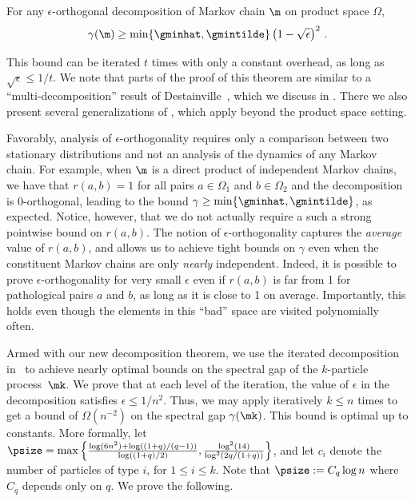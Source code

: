 \begin{theorem}\label{thm:productspaces}
For any $\epsilon$-orthogonal decomposition of Markov chain $\m$ on 
product space $\Omega$,
\[ \gamma(\m) \geq \min\{\gminhat, \gmintilde\}\left(1 -\sqrt{\epsilon}\right)^2\,.\]
\end{theorem}

\noindent This bound can be iterated $t$ times with 
only a constant overhead, as long as $\sqrt{\epsilon}\leq 1/t$.
We note that parts of the proof of this theorem are similar
to a ``multi-decomposition'' result of Destainville~\cite{Dest03},
which we discuss in .  There we also
present several generalizations of , 
which apply beyond the product space setting.

Favorably, analysis of $\epsilon$-orthogonality requires only a 
comparison between two stationary distributions and not an analysis of 
the dynamics of any Markov chain.  For example, when $\m$ is a direct 
product of independent Markov chains, we have that $r(a,b)=1$ for all 
pairs $a\in\Omega_1$ and $b\in\Omega_2$ and the decomposition is 
$0$-orthogonal, leading to the bound $\gamma\geq 
\min\{\gminhat,\gmintilde\}$, as expected.  Notice, however, that we do 
not actually require a such a strong pointwise bound on $r(a,b)$.  The 
notion of $\epsilon$-orthogonality captures the \emph{average} value of 
$r(a,b)$, and allows us to achieve tight bounds on $\gamma$ even when 
the constituent Markov chains are only \emph{nearly} independent.  
Indeed, it is possible to prove %
$\epsilon$-orthogonality for very small $\epsilon$ %
even if 
$r(a,b)$ is far from 1 for pathological pairs $a$ and $b$, as long as 
it is close to 1 on average. Importantly, this holds even though the 
elements in this ``bad'' space are visited polynomially often.  

Armed with our new decomposition theorem, we use the iterated 
decomposition in~\cite{MS} to achieve nearly optimal bounds on the 
spectral gap of the $k$-particle process~$\mk$. We prove that at each
level of the iteration, %
the value of $\epsilon$ in the decomposition satisfies $\epsilon\leq 1/n^2$. %
%
Thus, we may apply  iteratively $k\leq 
n$ times to get a bound of $\Omega(n^{-2})$ on the spectral gap 
$\gamma(\mk)$.  This bound is optimal up to constants. More formally, 
let $\psize = \max\left\{\frac{\log 
(6n^2)+\log((1+q)/(q-1))}{\log((1+q)/2)},  
\frac{\log^2(14)}{\log^2(2q/(1+q))}\right\}$, %
and let 
$c_i$ denote the number of particles of type $i$, for $1\leq i\leq k$.  
Note that $\psize := C_q \log n$  where $C_q$ depends only on $q.$
We prove the following.


